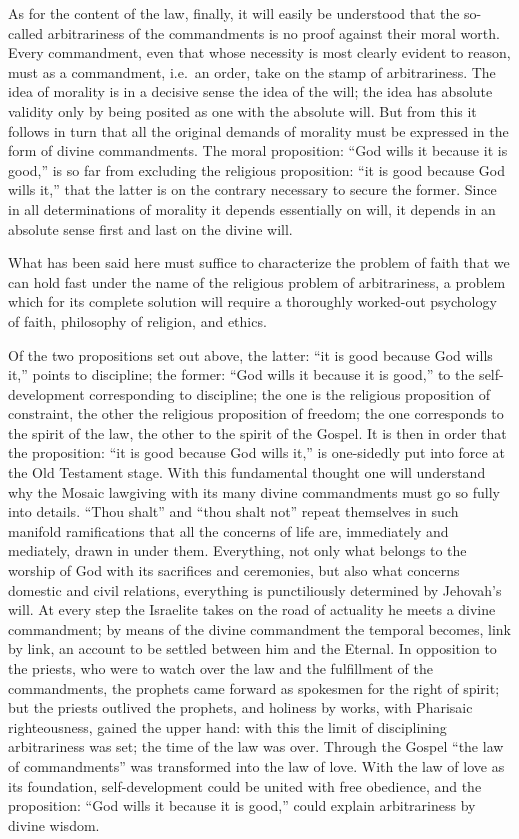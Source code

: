 \documentclass[12pt]{book}
\newcommand{\opage}[1]{\marginnote{\footnotesize\textit{[#1]}}}
\begin{document}
As for the content of the law, finally, it will easily be understood that
the so-called arbitrariness of the commandments is no proof against their
moral worth. Every commandment, even that whose necessity is most clearly
evident to reason, must as a commandment, i.e.\ an order, take on the
stamp of arbitrariness. The idea of morality is in a decisive sense the
idea of the will; the idea has absolute validity only by being posited as
one with the absolute will. But from this it follows in turn that all the
original demands of morality must be expressed in the form of divine
commandments. The moral proposition: ``God wills it because it is good,''
is so far from excluding the religious proposition: ``it is good because
God wills it,'' that the latter is on the contrary necessary to secure the
former. Since in all determinations of morality it depends essentially on
will, it depends in an absolute sense first and last on the divine will.

What has been said here must suffice to characterize the problem of faith
that we can hold fast under the name of the religious problem of
arbitrariness, a problem which for its complete solution will require a
thoroughly worked-out psychology of faith, philosophy of religion, and
ethics.

Of the two propositions set out above, the latter: ``it is good because
God wills it,'' points to discipline; the former: ``God wills it because
it is good,'' to the self-development corresponding to discipline; the one
is the religious proposition of constraint, the other the religious
proposition of freedom; the one corresponds to the spirit of the law, the
other to the spirit of the Gospel. It is then in order that the
proposition: ``it is good because God wills it,'' is one-sidedly put into
force at the Old Testament stage. With this fundamental thought one will
understand why the Mosaic lawgiving with its many divine
\opage{193}\setcounter{footnote}{0}%
commandments must go so fully into details. ``Thou shalt'' and ``thou shalt
not'' repeat themselves in such manifold ramifications that all the
concerns of life are, immediately and mediately, drawn in under them.
Everything, not only what belongs to the worship of God with its
sacrifices and ceremonies, but also what concerns domestic and civil
relations, everything is punctiliously determined by Jehovah's will. At
every step the Israelite takes on the road of actuality he meets a divine
commandment; by means of the divine commandment the temporal becomes, link
by link, an account to be settled between him and the Eternal. In
opposition to the priests, who were to watch over the law and the
fulfillment of the commandments, the prophets came forward as spokesmen
for the right of spirit; but the priests outlived the prophets, and
holiness by works, with Pharisaic righteousness, gained the upper hand:
with this the limit of disciplining arbitrariness was set; the time of the
law was over. Through the Gospel ``the law of commandments'' was
transformed into the law of love. With the law of love as its foundation,
self-development could be united with free obedience, and the proposition:
``God wills it because it is good,'' could explain arbitrariness by divine
wisdom.
\end{document}
